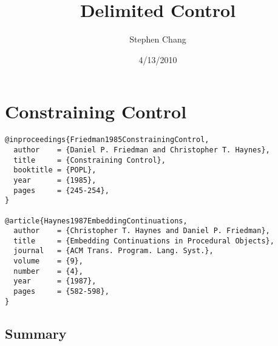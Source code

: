 \documentclass[letterpaper]{llncs}
\begin{document}

\title{Delimited Control}
\author{Stephen Chang}
\institute{}
\date{4/13/2010}
\maketitle

\section*{Constraining Control}%

\begin{verbatim}
@inproceedings{Friedman1985ConstrainingControl,
  author    = {Daniel P. Friedman and Christopher T. Haynes},
  title     = {Constraining Control},
  booktitle = {POPL},
  year      = {1985},
  pages     = {245-254},
}

@article{Haynes1987EmbeddingContinuations,
  author    = {Christopher T. Haynes and Daniel P. Friedman},
  title     = {Embedding Continuations in Procedural Objects},
  journal   = {ACM Trans. Program. Lang. Syst.},
  volume    = {9},
  number    = {4},
  year      = {1987},
  pages     = {582-598},
}
\end{verbatim}


\subsection*{Summary}
\end{document}
